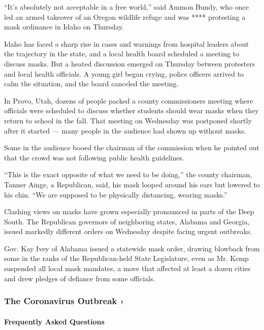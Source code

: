 ``It's absolutely not acceptable in a free world,'' said Ammon Bundy,
who once led an armed takeover of an Oregon wildlife refuge and was ****
protesting a mask ordinance in Idaho on Thursday.

Idaho has faced a sharp rise in cases and warnings from hospital leaders
about the trajectory in the state, and a local health board scheduled a
meeting to discuss masks. But a heated discussion emerged on Thursday
between protesters and local health officials. A young girl began
crying, police officers arrived to calm the situation, and the board
canceled the meeting.

In Provo, Utah, dozens of people packed a county commissioners meeting
where officials were scheduled to discuss whether students should wear
masks when they return to school in the fall. That meeting on Wednesday
was postponed shortly after it started --- many people in the audience
had shown up without masks.

Some in the audience booed the chairman of the commission when he
pointed out that the crowd was not following public health guidelines.

``This is the exact opposite of what we need to be doing,'' the county
chairman, Tanner Ainge, a Republican, said, his mask looped around his
ears but lowered to his chin. ``We are supposed to be physically
distancing, wearing masks.''

Clashing views on masks have grown especially pronounced in parts of the
Deep South. The Republican governors of neighboring states, Alabama and
Georgia, issued markedly different orders on Wednesday despite facing
urgent outbreaks.

Gov. Kay Ivey of Alabama issued a statewide mask order, drawing blowback
from some in the ranks of the Republican-held State Legislature, even as
Mr. Kemp suspended all local mask mandates, a move that affected at
least a dozen cities and drew pledges of defiance from some officials.

\href{https://www.nytimes.com/news-event/coronavirus?action=click\&pgtype=Article\&state=default\&region=MAIN_CONTENT_3\&context=storylines_faq}{}

\hypertarget{the-coronavirus-outbreak-}{%
\subsubsection{The Coronavirus Outbreak
›}\label{the-coronavirus-outbreak-}}

\hypertarget{frequently-asked-questions}{%
\paragraph{Frequently Asked
Questions}\label{frequently-asked-questions}}

